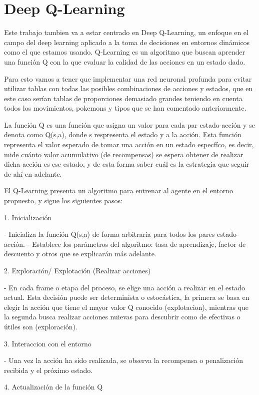 \chapter{Deep Q-Learning}
\usepackage{amsmath}  %
Este trabajo tambien va a estar centrado en Deep Q-Learning, un enfoque en el campo del deep learning aplicado a la toma de decisiones en entornos dinámicos como el que estamos usando. Q-Learning es un algoritmo que buscan aprender una función Q con la que evaluar la calidad de las acciones en un estado dado.

Para esto vamos a tener que implementar una red neuronal profunda para evitar utilizar tablas con todas las posibles combinaciones de acciones y estados, que en este caso serían tablas de proporciones demasiado grandes teniendo en cuenta todos los movimientos, pokemons y tipos que se han comentado anteriormente. 

La función Q es una función que asigna un valor para cada par estado-acción y se denota como Q(s,a), donde s respresenta el estado y a la acción. Esta función representa el valor esperado de tomar una acción en un estado especfíco, es decir, mide cuánto valor acumulativo (de recompensas) se espera obtener de realizar dicha acción es ese estado, y de esta forma saber cuál es la estrategia que seguir de ahí en adelante.

El Q-Learning presenta un algoritmo para entrenar al agente en el entorno propuesto, y sigue los siguientes pasos:

1. Inicialización

	- Inicializa la función Q(s,a) de forma arbitraria para todos los pares estado-	acción.
	- Establece los parámetros del algoritmo: tasa de aprendizaje, factor de descuento y 	otros que se explicarán más adelante.

2. Exploración/ Explotación (Realizar acciones)

	- En cada frame o etapa del proceso, se elige una acción a realizar en el estado 	actual. Esta decisión puede ser determinista o estocástica, la primera se basa en 	elegir la acción que tiene el mayor valor Q conocido (explotacion), mientras que la 	segunda busca realizar acciones nuievas para descubrir como de efectivas o útiles son 	(exploración).

3. Interaccion con el entorno

	- Una vez la acción ha sido realizada, se observa la recompensa o penalización 	recibida y el próximo estado.

4. Actualización de la función Q

